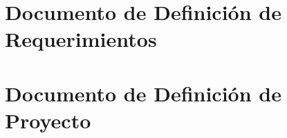 \documentclass[oneside,12pt,letterpaper]{report}
\theoremstyle{definition} \newtheorem{definicion}{Definici\'{o}n}
\theoremstyle{plain} \newtheorem{teorema}{Teorema}
\theoremstyle{plain} \newtheorem{lema}{Lema}
\begin{document}











\appendix
\chapter{Documento de Definición de Requerimientos }

\chapter{Documento de Definición de Proyecto }

%
%
%
%
%
%
%
\end{document}
